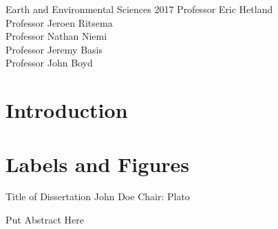 \documentclass[leqno]{report}
\theoremstyle{plain}
\theoremstyle{definition}
\theoremstyle{remark}
\numberwithin{theorem}{chapter}        %
\begin{document}

{Earth and Environmental Sciences} {2017}
{ Professor Eric Hetland \\
  Professor Jeroen Ritsema \\
  Professor Nathan Niemi \\
  Professor Jeremy Basis \\
  Professor John Boyd}



\initializefrontsections


\setcounter{page}{1}





\tableofcontents
\listoffigures

\startthechapters 



\chapter{Introduction}
\label{intro} 

\chapter{Labels and Figures}
\label{chap2}

%
%


%



\startabstractpage
{Title of Dissertation} {John Doe} {Chair: Plato}

Put Abstract Here
\end{document}
